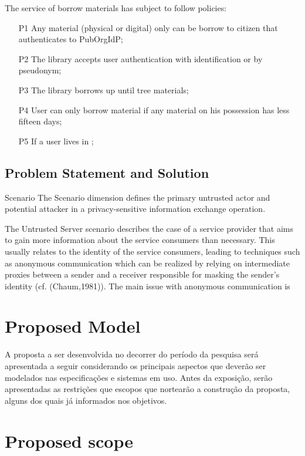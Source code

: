 \documentclass{doublecol-new}
\begin{document}
The service of borrow materials has subject to follow policies:
\begin{enumerate}
	\item [P1] Any material (physical or digital) only can be borrow to citizen that authenticates to PubOrgIdP;
	\item [P2] The library accepts user authentication with identification or by pseudonym;
	\item [P3] The library borrows up until tree materials;
	\item [P4] User can only borrow material if any material on his possession has less fifteen days;
	\item [P5] If a user lives in ;	
\end{enumerate}



\subsection[sec:problemstatement]{Problem Statement and Solution}

Scenario The Scenario dimension defines the primary untrusted actor and potential attacker in a privacy-sensitive information exchange operation.

The Untrusted Server scenario describes the case of a service provider that aims to gain more information about the service
consumers than necessary. This usually relates to the identity of the service consumers, leading to techniques such as
anonymous communication which can be realized by relying on intermediate proxies between a sender and a receiver
responsible for masking the sender's identity (cf. (Chaum,1981)). The main issue with anonymous communication is



\section{Proposed Model}
A proposta a ser desenvolvida no decorrer do período da pesquisa será apresentada a seguir considerando os principais aspectos que deverão ser modelados nas especificações e sistemas em uso. Antes da exposição, serão apresentadas as restrições que escopos que nortearão a construção da proposta, alguns dos quais já informados nos objetivos.



\section{Proposed scope}
\end{document}
